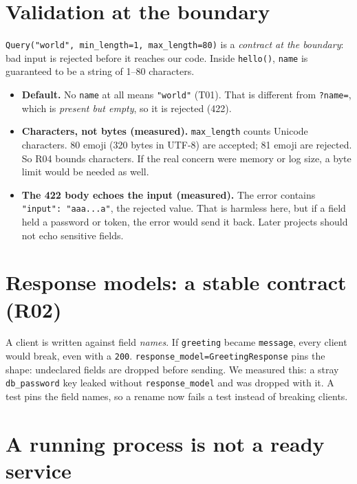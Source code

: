 \documentclass[11pt,a4paper]{article}
\newcommand{\code}[1]{\texttt{#1}}
\begin{document}
\section{Validation at the boundary}

\code{Query("world", min\_length=1, max\_length=80)} is a \emph{contract at
the boundary}: bad input is rejected before it reaches our code. Inside
\code{hello()}, \code{name} is guaranteed to be a string of 1--80 characters.

\begin{itemize}
  \item \textbf{Default.} No \code{name} at all means \code{"world"} (T01).
        That is different from \code{?name=}, which is \emph{present but
        empty}, so it is rejected (422).
  \item \textbf{Characters, not bytes (measured).} \code{max\_length} counts
        Unicode characters. 80 emoji (320 bytes in UTF-8) are accepted;
        81 emoji are rejected. So R04 bounds characters. If the real concern
        were memory or log size, a byte limit would be needed as well.
  \item \textbf{The 422 body echoes the input (measured).} The error contains
        \code{"input": "aaa...a"}, the rejected value. That is harmless here,
        but if a field held a password or token, the error would send it
        back. Later projects should not echo sensitive fields.
\end{itemize}

\section{Response models: a stable contract (R02)}

A client is written against field \emph{names}. If \code{greeting} became
\code{message}, every client would break, even with a \code{200}.
\code{response\_model=GreetingResponse} pins the shape: undeclared fields are
dropped before sending. We measured this: a stray \code{db\_password} key
leaked without \code{response\_model} and was dropped with it. A test pins the
field names, so a rename now fails a test instead of breaking clients.

\section{A running process is not a ready service}
\end{document}

